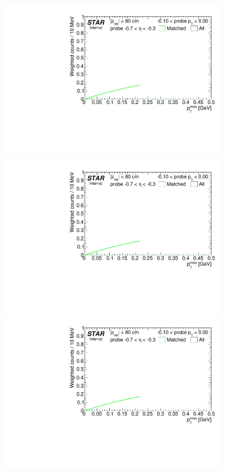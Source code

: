 \begin{figure}[h!]
{}~
\parbox{0.24\textwidth}{
  \centering
  \includegraphics[width=\linewidth,page=6]{graphics/correctionsToEff/TOF_tagAndProbe/Fitting_effVsPt_mc_ETABINS_D.CPT2.pdf}\\
  \includegraphics[width=\linewidth,page=8]{graphics/correctionsToEff/TOF_tagAndProbe/Fitting_effVsPt_mc_ETABINS_D.CPT2.pdf}\\
  \includegraphics[width=\linewidth,page=10]{graphics/correctionsToEff/TOF_tagAndProbe/Fitting_effVsPt_mc_ETABINS_D.CPT2.pdf}\\[84pt]

}%
\end{figure}


